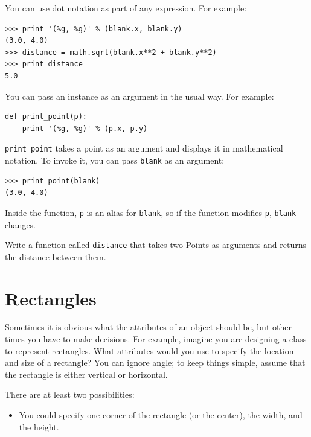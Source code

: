 \documentclass[10pt]{book}
\begin{document}
{You can use dot notation as part of any expression.  For example:

\beforeverb
\begin{verbatim}
>>> print '(%g, %g)' % (blank.x, blank.y)
(3.0, 4.0)
>>> distance = math.sqrt(blank.x**2 + blank.y**2)
>>> print distance
5.0
\end{verbatim}
\afterverb
%
You can pass an instance as an argument in the usual way.
For example:


\beforeverb
\begin{verbatim}
def print_point(p):
    print '(%g, %g)' % (p.x, p.y)
\end{verbatim}
\afterverb
%
\verb"print_point" takes a point as an argument and displays it in
mathematical notation.  To invoke it, you can pass {\tt blank} as
an argument:

\beforeverb
\begin{verbatim}
>>> print_point(blank)
(3.0, 4.0)
\end{verbatim}
\afterverb
%
Inside the function, {\tt p} is an alias for {\tt blank}, so if
the function modifies {\tt p}, {\tt blank} changes.



\begin{ex}
Write a function called {\tt distance} that takes two Points
as arguments and returns the distance between them.
\end{ex}



\section{Rectangles}

Sometimes it is obvious what the attributes of an object should be,
but other times you have to make decisions.  For example, imagine you
are designing a class to represent rectangles.  What attributes would
you use to specify the location and size of a rectangle?  You can
ignore angle; to keep things simple, assume that the rectangle is
either vertical or horizontal.


There are at least two possibilities: 

\begin{itemize}

\item You could specify one corner of the rectangle
(or the center), the width, and the height.


\end{itemize}}
\end{document}
